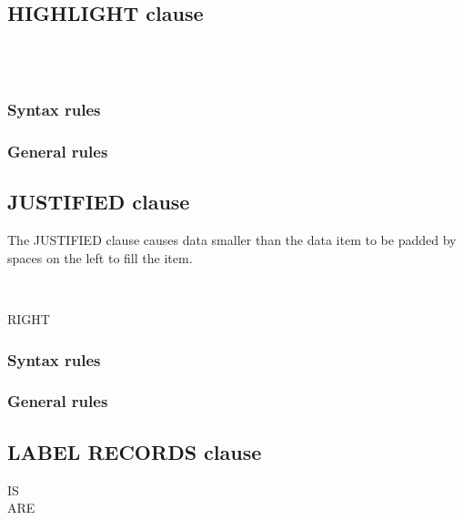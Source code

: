 \subsection{HIGHLIGHT clause}

\begin{syntax}
  \begin{1=}
     \\
     \\
  \end{1=}
\end{syntax}

\subsubsection{Syntax rules}

\subsubsection{General rules}

\subsection{JUSTIFIED clause}

The JUSTIFIED clause causes data smaller than the data item to be padded by spaces on the left to fill the item.

\begin{syntax}
  \begin{1=}
     \\
  \end{1=}
  RIGHT
\end{syntax}

\subsubsection{Syntax rules}

\subsubsection{General rules}

\subsection{LABEL RECORDS clause}

\begin{syntax}[\deletedcolour]
  \begin{1=}
     IS \\
     ARE
  \end{1=}
  \begin{1=}
     \\
  \end{1=}
\end{syntax}

